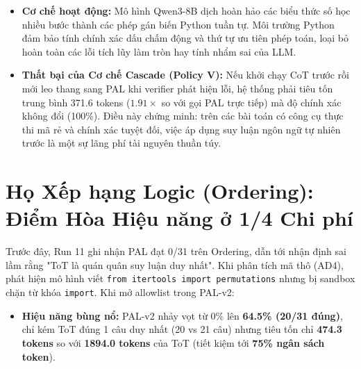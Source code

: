 \documentclass[11pt,a4paper]{report}
\begin{document}
\begin{itemize}[leftmargin=*]
    \item \textbf{Cơ chế hoạt động:} Mô hình Qwen3-8B dịch hoàn hảo các biểu thức số học nhiều bước thành các phép gán biến Python tuần tự. Môi trường Python đảm bảo tính chính xác dấu chấm động và thứ tự ưu tiên phép toán, loại bỏ hoàn toàn các lỗi tích lũy làm tròn hay tính nhẩm sai của LLM.
    \item \textbf{Thất bại của Cơ chế Cascade (Policy V):} Nếu khởi chạy CoT trước rồi mới leo thang sang PAL khi verifier phát hiện lỗi, hệ thống phải tiêu tốn trung bình 371.6 tokens ($1.91\times$ so với gọi PAL trực tiếp) mà độ chính xác không đổi (100\%). Điều này chứng minh: trên các bài toán có công cụ thực thi mã rẻ và chính xác tuyệt đối, việc áp dụng suy luận ngôn ngữ tự nhiên trước là một sự lãng phí tài nguyên thuần túy.
\end{itemize}

\section{Họ Xếp hạng Logic (Ordering): Điểm Hòa Hiệu năng ở 1/4 Chi phí}

Trước đây, Run 11 ghi nhận PAL đạt 0/31 trên Ordering, dẫn tới nhận định sai lầm rằng "ToT là quán quân suy luận duy nhất". Khi phân tích mã thô (AD4), phát hiện mô hình viết \texttt{from itertools import permutations} nhưng bị sandbox chặn từ khóa \texttt{import}. Khi mở allowlist trong PAL-v2:
\begin{itemize}[leftmargin=*]
    \item \textbf{Hiệu năng bùng nổ:} PAL-v2 nhảy vọt từ 0\% lên \textbf{64.5\% (20/31 đúng)}, chỉ kém ToT đúng 1 câu duy nhất (20 vs 21 câu) nhưng tiêu tốn chỉ \textbf{474.3 tokens} so với \textbf{1894.0 tokens} của ToT (tiết kiệm tới \textbf{75\% ngân sách token}).
\end{itemize}
\end{document}
